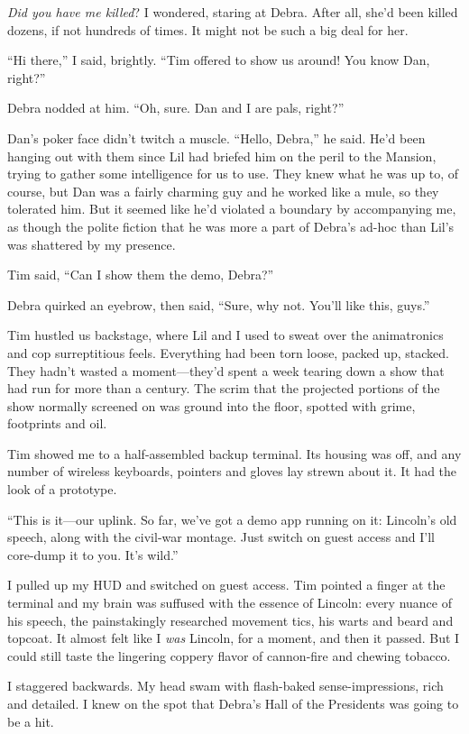 \emph{Did you have me killed}? I wondered, staring at Debra. After
all, she'd been killed dozens, if not hundreds of times. It might
not be such a big deal for her.

“Hi there,” I said, brightly. “Tim offered to show us around! You
know Dan, right?”

Debra nodded at him. “Oh, sure. Dan and I are pals, right?”

Dan's poker face didn't twitch a muscle. “Hello, Debra,” he said.
He'd been hanging out with them since Lil had briefed him on the
peril to the Mansion, trying to gather some intelligence for us to
use. They knew what he was up to, of course, but Dan was a fairly
charming guy and he worked like a mule, so they tolerated him. But
it seemed like he'd violated a boundary by accompanying me, as
though the polite fiction that he was more a part of Debra's ad-hoc
than Lil's was shattered by my presence.

Tim said, “Can I show them the demo, Debra?”

Debra quirked an eyebrow, then said, “Sure, why not. You'll like
this, guys.”

Tim hustled us backstage, where Lil and I used to sweat over the
animatronics and cop surreptitious feels. Everything had been torn
loose, packed up, stacked. They hadn't wasted a moment—they'd spent
a week tearing down a show that had run for more than a century.
The scrim that the projected portions of the show normally screened
on was ground into the floor, spotted with grime, footprints and
oil.

Tim showed me to a half-assembled backup terminal. Its housing was
off, and any number of wireless keyboards, pointers and gloves lay
strewn about it. It had the look of a prototype.

“This is it—our uplink. So far, we've got a demo app running on it:
Lincoln's old speech, along with the civil-war montage. Just switch
on guest access and I'll core-dump it to you. It's wild.”

I pulled up my HUD and switched on guest access. Tim pointed a
finger at the terminal and my brain was suffused with the essence
of Lincoln: every nuance of his speech, the painstakingly
researched movement tics, his warts and beard and topcoat. It
almost felt like I \emph{was} Lincoln, for a moment, and then it
passed. But I could still taste the lingering coppery flavor of
cannon-fire and chewing tobacco.

I staggered backwards. My head swam with flash-baked
sense-impressions, rich and detailed. I knew on the spot that
Debra's Hall of the Presidents was going to be a hit.


